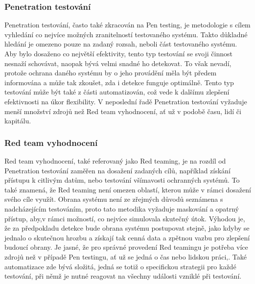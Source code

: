 \subsubsection{Penetration testování}
Penetration testování, často také zkracován na Pen testing, je metodologie s cílem vyhledání co nejvíce možných zranitelností testovaného systému.
Takto důkladné hledání je omezeno pouze na zadaný rozsah, neboli část testovaného systému.
Aby bylo dosaženo co největší efektivity, tento typ testování se svoji činnost nesnaží schovávat, naopak bývá velmi snadné ho detekovat.
To však nevadí, protože ochrana daného systému by o jeho provádění měla být předem informována a může tak zkoušet, zda i detekce funguje optimálně.
Tento typ testování může být také z části automatizován, což vede k dalšímu zlepšení efektivnosti na úkor flexibility.
V neposlední řadě Penetration testování vyžaduje menší množství zdrojů než Red team vyhodnocení, ať už v podobě času, lidí či kapitálu.

\subsubsection{Red team vyhodnocení}
Red team vyhodnocení, také referovaný jako Red teaming, je na rozdíl od Penetration testování zaměřen na dosažení zadaných cílů, například získání přístupu k citlivým datům, nebo testování všímavosti ochranných systémů.
To také znamená, že Red teaming není omezen oblastí, kterou může v rámci dosažení svého cíle využít.
Obrana systému není ze zřejmých důvodů seznámena s nadcházejícím testováním, proto tato metodika vyžaduje maskování a opatrný přístup, aby,v rámci možností, co nejvíce simulovala skutečný útok.
Výhodou je, že za předpokladu detekce bude obrana systému postupovat stejně, jako kdyby se jednalo o skutečnou hrozbu a získají tak cenná data a zpětnou vazbu pro zlepšení budoucí obrany.
Je jasné, že pro správné provedení Red teamingu je potřeba více zdrojů než v případě Pen testingu, ať už se jedná o čas nebo lidskou práci,.
Také automatizace zde bývá složitá, jedná se totiž o specifickou strategii pro každé testování, při němž je nutné reagovat na všechny události vzniklé při testování.\cite{securityInteligence_pen_test_red_team_purple_team, lootsec_pen_test_vs_red_team, astra_pen_test_vs_red_teaming}

